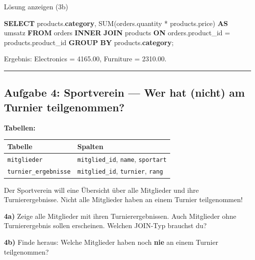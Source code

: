 \documentclass[
  nswissgerman,
  a4paper,
  DIV=11,
  numbers=noendperiod,
  ngerman]{scrreprt}
\newenvironment{Shaded}{\begin{snugshade}}{\end{snugshade}}
\newcommand{\FunctionTok}[1]{\textcolor[rgb]{0.28,0.35,0.67}{#1}}
\newcommand{\KeywordTok}[1]{\textcolor[rgb]{0.00,0.23,0.31}{\textbf{#1}}}
\newcommand{\NormalTok}[1]{\textcolor[rgb]{0.00,0.23,0.31}{#1}}
\newcommand{\OperatorTok}[1]{\textcolor[rgb]{0.37,0.37,0.37}{#1}}
\newcounter{none} %
\begin{document}
Lösung anzeigen (3b)

\begin{Shaded}
\begin{Highlighting}[numbers=left,,]
\KeywordTok{SELECT}\NormalTok{ products.}\KeywordTok{category}\NormalTok{,}
       \FunctionTok{SUM}\NormalTok{(orders.quantity }\OperatorTok{*}\NormalTok{ products.price) }\KeywordTok{AS}\NormalTok{ umsatz}
\KeywordTok{FROM}\NormalTok{ orders}
\KeywordTok{INNER} \KeywordTok{JOIN}\NormalTok{ products}
  \KeywordTok{ON}\NormalTok{ orders.product\_id }\OperatorTok{=}\NormalTok{ products.product\_id}
\KeywordTok{GROUP} \KeywordTok{BY}\NormalTok{ products.}\KeywordTok{category}\NormalTok{;}
\end{Highlighting}
\end{Shaded}

Ergebnis: Electronics = 4165.00, Furniture = 2310.00.

\begin{center}\rule{0.5\linewidth}{0.5pt}\end{center}

\subsection{Aufgabe 4: Sportverein --- Wer hat (nicht) am Turnier
teilgenommen?}\label{aufgabe-4-sportverein-wer-hat-nicht-am-turnier-teilgenommen}

\textbf{Tabellen:}

{\def\LTcaptype{none} %
\begin{longtable}[]{@{}ll@{}}
\toprule\noalign{}
Tabelle & Spalten \\
\midrule\noalign{}
\endhead
\bottomrule\noalign{}
\endlastfoot
\texttt{mitglieder} & \texttt{mitglied\_id}, \texttt{name},
\texttt{sportart} \\
\texttt{turnier\_ergebnisse} & \texttt{mitglied\_id}, \texttt{turnier},
\texttt{rang} \\
\end{longtable}
}

Der Sportverein will eine Übersicht über alle Mitglieder und ihre
Turnierergebnisse. Nicht alle Mitglieder haben an einem Turnier
teilgenommen!

\textbf{4a)} Zeige alle Mitglieder mit ihren Turnierergebnissen. Auch
Mitglieder ohne Turnierergebnis sollen erscheinen. Welchen JOIN-Typ
brauchst du?

\textbf{4b)} Finde heraus: Welche Mitglieder haben noch \textbf{nie} an
einem Turnier teilgenommen?
\end{document}
